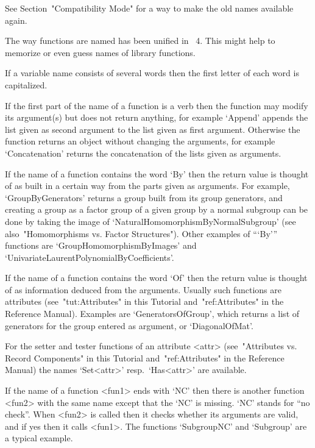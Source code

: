 See Section~"Compatibility Mode" for a way to make the old names
available again.



The way functions are named has been unified in {\GAP}~4.
This might help to memorize or even guess names of library functions.

If a variable name consists of several words then the first
letter of each word is capitalized.

If the first part of the name of a function is a verb then the function
may modify its argument(s) but does not return anything,
for example `Append' appends the list given as second argument to the
list given as first argument.
Otherwise the function returns an object without changing the arguments,
for example `Concatenation' returns the concatenation of the lists
given as arguments.

If the name of a function contains the word `By' then the return value is
thought of as built in a certain way from the parts given as arguments.
For example, `GroupByGenerators' returns a group built from its group
generators, and creating a group as a factor group of a given group
by a normal subgroup can be done by taking the image of
`NaturalHomomorphismByNormalSubgroup'
(see also~"Homomorphisms vs. Factor Structures").
Other examples of ```By''' functions are `GroupHomomorphismByImages' and
`UnivariateLaurentPolynomialByCoefficients'.

If the name of a function contains the word `Of' then the return value is
thought of as information deduced from the arguments.
Usually such functions are attributes
(see~"tut:Attributes" in this Tutorial and~"ref:Attributes"
in the Reference Manual).
Examples are `GeneratorsOfGroup', which returns a list of generators for
the group entered as argument, or `DiagonalOfMat'.

For the setter and tester functions of an attribute <attr>
(see~"Attributes vs. Record Components" in this Tutorial
and~"ref:Attributes" in the Reference Manual)
the names `Set<attr>' resp.~`Has<attr>' are available.

If the name of a function <fun1> ends with `NC' then there is another
function <fun2> with the same name except that the `NC' is missing.
`NC' stands for ``no check''.
When <fun2> is called then it checks whether its arguments are valid,
and if yes then it calls <fun1>.
The functions `SubgroupNC' and `Subgroup' are a typical example.


